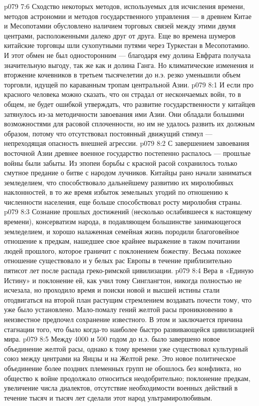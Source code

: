 \vs p079 7:6 Сходство некоторых методов, используемых для исчисления времени, методов астрономии и методов государственного управления --- в древнем Китае и Месопотамии обусловлено наличием торговых связей между этими двумя центрами, расположенными далеко друг от друга. Еще во времена шумеров китайские торговцы шли сухопутными путями через Туркестан в Месопотамию. И этот обмен не был односторонним --- благодаря ему долина Евфрата получала значительную выгоду, так же как и долина Ганга. Но климатические изменения и вторжение кочевников в третьем тысячелетии до н.э. резко уменьшили объем торговли, идущей по караванным тропам центральной Азии.
\vs p079 8:1 И если про красного человека можно сказать, что он страдал от нескончаемых войн, то в общем, не будет ошибкой утверждать, что развитие государственности у китайцев затянулось из\hyp{}за методичности завоевания ими Азии. Они обладали большими возможностями для расовой сплоченности, но им не удалось развить их должным образом, потому что отсутствовал постоянный движущий стимул --- непреходящая опасность внешней агрессии.
\vs p079 8:2 С завершением завоевания восточной Азии древнее военное государство постепенно распалось --- прошлые войны были забыты. Из эпопеи борьбы с красной расой сохранилось только смутное предание о битве с народом лучников. Китайцы рано начали заниматься земледелием, что способствовало дальнейшему развитию их миролюбивых наклонностей, в то же время избыток земельных угодий по отношению к численности населения, еще больше способствовал росту миролюбия страны.
\vs p079 8:3 Сознание прошлых достижений (несколько ослабившееся к настоящему времени), консерватизм народа, в подавляющем большинстве занимающегося земледелием, и хорошо налаженная семейная жизнь породили благоговейное отношение к предкам, нашедшее свое крайнее выражение в таком почитании людей прошлого, которое граничит с поклонением божеству. Весьма похожее отношение существовало и у белых рас Европы в течение приблизительно пятисот лет после распада греко\hyp{}римской цивилизации.
\vs p079 8:4 Вера в «Единую Истину» и поклонение ей, как учил тому Синглангтон, никогда полностью не исчезала, но проходило время и поиски новой и высшей истины стали отодвигаться на второй план растущим стремлением воздавать почести тому, что уже было установлено. Мало\hyp{}помалу гений желтой расы проникновению в неизвестное предпочел сохранение известного. В этом и заключается причина стагнации того, что было когда\hyp{}то наиболее быстро развивающейся цивилизацией мира.
\vs p079 8:5 \pc Между 4000 и 500 годом до н.э. было завершено новое объединение желтой расы, однако к тому времени уже существовал культурный союз между центрами на Янцзы и на Желтой реке. Это новое политическое объединение более поздних племенных групп не обошлось без конфликта, но общество к войне продолжало относиться неодобрительно; поклонение предкам, увеличение числа диалектов, отсутствие необходимости военных действий в течение тысяч и тысяч лет сделали этот народ ультрамиролюбивым.
